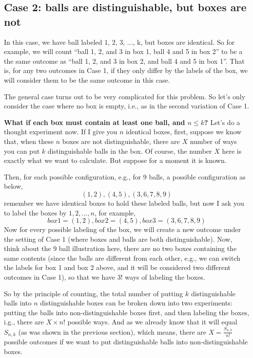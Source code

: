 \documentclass[12pt]{article}
\begin{document}
\subsection{Case 2: balls are distinguishable, but boxes are not}
In this case, we have ball labeled 1, 2, 3, ..., k, but boxes are identical. So  for example, we will count ``ball 1, 2, and 3 in box 1, ball 4 and 5 in box 2'' to be a the same outcome as ``ball 1, 2, and 3 in box 2, and ball 4 and 5 in box 1''. That is, for any two outcomes in Case 1, if they only differ by the labels of the box, we will consider them to be the same outcome in this case. 

The general case turns out to be very complicated for this problem. So let's only consider the case where no box is empty, i.e., as in the second variation of Case 1. 

\textbf{What if each box must contain at least one ball, and $n \leq k$? } 
Let's do a thought experiment now. If I give you $n$ identical boxes, first, suppose we know that, when these $n$ boxes are not distinguishable, there are $X$ number of ways you can put $k$ distinguishable balls in the box. Of course, the number $X$ here is exactly what we want to calculate. But suppose for a moment it is known.

Then, for each possible configuration, e.g., for 9 balls, a possible configuration as below, 
\[
	(1, 2), (4, 5), (3, 6, 7, 8, 9)
\]
remember we have identical boxes to hold these labeled balls, but now I ask you to label the boxes by $1, 2, ..., n$, for example, 
\[
	box 1 = (1, 2), box 2 = (4, 5), box 3 = (3, 6, 7, 8, 9)
\]
Now for every possible labeling of the box, we will create a new outcome under the setting of Case 1 (where boxes and balls are both distinguishable). Now, think about the 9 ball illustration here, there are no two boxes containing the same contents (since the balls are different from each other, e.g., we can switch the labels for box 1 and box 2 above, and it will be considered two different outcomes in Case 1), so that we have $3!$ ways of labeling the boxes. 

So by the principle of counting, the total number of putting $k$ distinguishable balls into $n$ distinguishable boxes can be broken down into two experiments: putting the balls into non-distinguishable boxes first, and then labeling the boxes, i.g., there are $X \times n!$ possible ways. And as we already know that it will equal $S_{n, k}$ (as was shown in the previous section), which means, there are $X = \frac{S_{n, k}}{n!}$ possible outcomes if we want to put distinguishable balls into non-distinguishable boxes.
\end{document}

